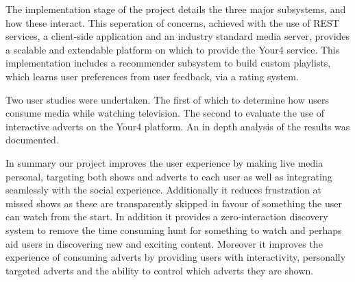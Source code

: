 The implementation stage of the project details the three major subsystems, and how these interact. This seperation of concerns, achieved with the use of REST services, a client-side application and an industry standard media server, provides a scalable and extendable platform on which to provide the Your4 service. This implementation includes a recommender subsystem to build custom playlists, which learns user preferences from user feedback, via a rating system.

Two user studies were undertaken. The first of which to determine how users consume media while watching television. The second to evaluate the use of interactive adverts on the Your4 platform. An in depth analysis of the results was documented.



In summary our project improves the user experience by making live media personal, targeting both shows and adverts to each user as well as integrating seamlessly with the social experience. Additionally it reduces frustration at missed shows as these are transparently skipped in favour of something the user can watch from the start. In addition it provides a zero-interaction discovery system to remove the time consuming hunt for something to watch and perhaps aid users in discovering new and exciting content. Moreover it improves the experience of consuming adverts by providing users with interactivity, personally targeted adverts and the ability to control which adverts they are shown. 

